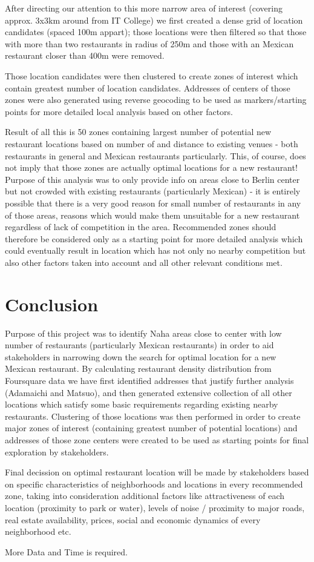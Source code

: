 \documentclass[11pt]{article}
\begin{document}
After directing our attention to this more narrow area of interest (covering approx. 3x3km around from IT College) we first created a dense grid of location candidates (spaced 100m appart); those locations were then filtered so that those with more than two restaurants in radius of 250m and those with an Mexican restaurant closer than 400m were removed.

Those location candidates were then clustered to create zones of interest which contain greatest number of location candidates. Addresses of centers of those zones were also generated using reverse geocoding to be used as markers/starting points for more detailed local analysis based on other factors.

Result of all this is 50 zones containing largest number of potential new restaurant locations based on number of and distance to existing venues - both restaurants in general and Mexican restaurants particularly. This, of course, does not imply that those zones are actually optimal locations for a new restaurant! Purpose of this analysis was to only provide info on areas close to Berlin center but not crowded with existing restaurants (particularly Mexican) - it is entirely possible that there is a very good reason for small number of restaurants in any of those areas, reasons which would make them unsuitable for a new restaurant regardless of lack of competition in the area. Recommended zones should therefore be considered only as a starting point for more detailed analysis which could eventually result in location which has not only no nearby competition but also other factors taken into account and all other relevant conditions met.

\section{Conclusion}

Purpose of this project was to identify Naha areas close to center with low number of restaurants (particularly Mexican restaurants) in order to aid stakeholders in narrowing down the search for optimal location for a new Mexican restaurant. By calculating restaurant density distribution from Foursquare data we have first identified addresses that justify further analysis (Adamaichi and Matsuo), and then generated extensive collection of all other locations which satisfy some basic requirements regarding existing nearby restaurants. Clustering of those locations was then performed in order to create major zones of interest (containing greatest number of potential locations) and addresses of those zone centers were created to be used as starting points for final exploration by stakeholders.

Final decission on optimal restaurant location will be made by stakeholders based on specific characteristics of neighborhoods and locations in every recommended zone, taking into consideration additional factors like attractiveness of each location (proximity to park or water), levels of noise / proximity to major roads, real estate availability, prices, social and economic dynamics of every neighborhood etc.

More Data and Time is required.

\medskip
 
\end{document}
